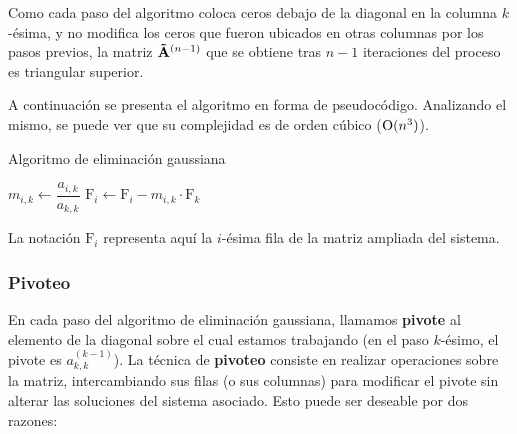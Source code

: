 Como cada paso del algoritmo coloca ceros debajo de la diagonal en la columna
$k$-ésima, y no modifica los ceros que fueron ubicados en otras columnas por
los pasos previos, la matriz $\mathbf{\tilde A}^{(n-1)}$ que se obtiene tras
$n-1$ iteraciones del proceso es triangular superior.

A continuación se presenta el algoritmo en forma de pseudocódigo. Analizando
el mismo, se puede ver que su complejidad es de orden cúbico ($\mathrm{O}(n^3)$).

\begin{algorithm}[H]
\caption{Algoritmo de eliminación gaussiana}
\label{algo:eliminacion-gauss}

 {
     {
         {
            $m_{i,k} \gets \dfrac{a_{i,k}}{a_{k,k}}$ \;
            $\mathrm{F}_i \gets \mathrm{F}_i - m_{i,k} \cdot \mathrm{F}_k$ \;
        }
    }
    {
         {
            \Error
        }
    }
}
\end{algorithm}

La notación $\mathrm{F}_i$ representa aquí la $i$-ésima fila de la matriz ampliada del
sistema.

\subsubsection{Pivoteo}

En cada paso del algoritmo de eliminación gaussiana, llamamos \textbf{pivote}
al elemento de la diagonal sobre el cual estamos trabajando (en el paso
$k$-ésimo, el pivote es $a^{(k-1)}_{k,k}$). La técnica de \textbf{pivoteo}
consiste en realizar operaciones sobre la matriz, intercambiando sus filas
(o sus columnas) para modificar el pivote sin alterar las soluciones
del sistema asociado. Esto puede ser deseable por dos razones:


